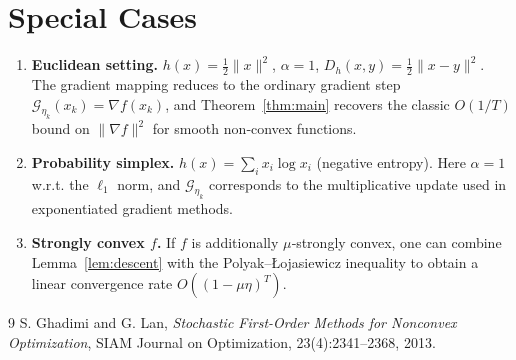\documentclass{article}
\newcommand{\Breg}{D_{h}}
\newcommand{\grad}{\nabla}
\begin{document}
\section*{Special Cases}
\begin{enumerate}
\item \textbf{Euclidean setting.} $h(x)=\tfrac12\|x\|^{2}$, $\alpha=1$, $\Breg(x,y)=\tfrac12\|x-y\|^{2}$. The gradient mapping reduces to the ordinary gradient step $\mathcal{G}_{\eta_{k}}(x_{k})=\grad f(x_{k})$, and Theorem~\ref{thm:main} recovers the classic $O(1/T)$ bound on $\|\grad f\|^{2}$ for smooth non‑convex functions.
\item \textbf{Probability simplex.} $h(x)=\sum_{i}x_{i}\log x_{i}$ (negative entropy). Here $\alpha=1$ w.r.t. the $\ell_{1}$ norm, and $\mathcal{G}_{\eta_{k}}$ corresponds to the multiplicative update used in exponentiated gradient methods.
\item \textbf{Strongly convex $f$.} If $f$ is additionally $\mu$‑strongly convex, one can combine Lemma~\ref{lem:descent} with the Polyak–Łojasiewicz inequality to obtain a linear convergence rate $O((1-\mu\eta)^{T})$.
\end{enumerate}

\begin{thebibliography}{9}
S. Ghadimi and G. Lan, \emph{Stochastic First-Order Methods for Nonconvex Optimization}, SIAM Journal on Optimization, 23(4):2341–2368, 2013.
\end{thebibliography}
\end{document}
